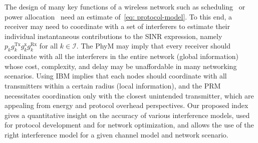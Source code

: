 \documentclass[12pt, draftclsnofoot, onecolumn]{IEEEtran}
\begin{document}
The design of many key functions of a wireless network such as scheduling~\cite{modiano2006maximizing} or power allocation~\cite{rashid1998joint} need an estimate of~\eqref{eq: protocol-model}. To this end,
a receiver may need to coordinate with a set of interferers to estimate their individual instantaneous contributions to the SINR expression, namely $p_k g_{k}^{\mathrm{Tx}} g_{k}^{\mathrm{x}} g_{k}^{\mathrm{Rx}}$ for all $k\in \mathcal{I}$. The PhyM may imply that every receiver should coordinate with all the interferers in the entire network (global information) whose cost, complexity, and delay may be unaffordable in many networking scenarios. Using IBM implies that each nodes should coordinate with all transmitters within a certain radius (local information), and the PRM necessitates coordination only with the closest unintended transmitter, which are appealing from energy and protocol overhead perspectives. Our proposed index gives a quantitative insight on the accuracy of various interference models, used for protocol development and for network optimization, and allows the use of the right interference model for a given channel model and network scenario.

\end{document}
